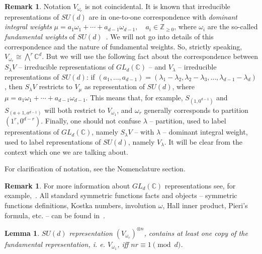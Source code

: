 \documentclass[11pt,letterpaper]{article}
\theoremstyle{plain}
\theoremstyle{plain}
\theoremstyle{plain}
\theoremstyle{plain}
\theoremstyle{plain}
\theoremstyle{plain}
\theoremstyle{plain}
\newtheorem{smlemma}[smtheorem]{Lemma}
\theoremstyle{definition}
\newtheorem{smremark}[smtheorem]{Remark}
\theoremstyle{plain}
\begin{document}
\begin{smremark}\label{rem:fundamental_weights}
    Notation $V_{\omega_r}$ is not coincidental. It is known that irreducible representations of $SU(d)$ are in one-to-one correspondence with \textit{dominant integral weights} $\mu=a_1 \omega_1+\cdots+a_{d-1} \omega_{d-1}, \quad a_i \in \mathbb{Z}_{\geq 0}$,
    where $\omega_i$ are the so-called \textit{fundamental weights} of $SU(d)$~\cite{Hall2015}.
    We will not go into details of this correspondence and the nature of fundamental weights. So, strictly speaking, $V_{\omega_r}\cong \bigwedge^r \mathbb C^d$.  
    But we will use the following fact about the correspondence between $S_\lambda V$ -- irreducible representations of $GL_d(\mathbb{C})$ -- and $V_\lambda$ -- irreducible representations of $SU(d)$:
    if $\left(a_1, \ldots, a_{d-1}\right)=\left(\lambda_1-\lambda_2, \lambda_2-\lambda_3, \ldots, \lambda_{d-1}-\lambda_d\right)$, then $S_\lambda V$ restricts to $V_\mu$ as representation of $SU(d)$, where $\mu=a_1 \omega_1+\cdots+a_{d-1} \omega_{d-1}$.
    This means that, for example, $S_{(1, 0^{d-1})}$ and $S_{(a+1, a^{d-1})}$ will both restrict to $V_{\omega_1}$, and $\omega_r$ generally corresponds to partition $(1^r, 0^{d-r})$.
    Finally, one should not confuse $\lambda$ -- partition, used to label representations of $GL_d(\mathbb{C})$, namely $S_\lambda V$ -- with $\lambda$ -- dominant integral weight, used to label representations of $SU(d)$, namely $V_\lambda$. It will be clear from the context which one we are talking about.
\end{smremark}

For clarification of notation, see the Nomenclature section.

\begin{smremark}
    For more information about $GL_d(\mathbb{C})$ representations see, for example,~\cite{FultonHarris1991}.
    All standard symmetric functions facts and objects -- symmetric functions definitions, Kostka numbers, involution $\omega$, Hall inner product, Pieri's formula, etc. -- can be found in~\cite{Macdonald1995}.
\end{smremark}

\begin{smlemma}\label{lem:fundamental_in_extirior_power}
    $SU(d)$ representation $\left(V_{\omega_r}\right)^{\otimes n}$, contains 
    at least one copy of the fundamental representation, i. e. $V_{\omega_1}$, iff $nr\equiv 1 \pmod{d}$.
\end{smlemma}
\end{document}

